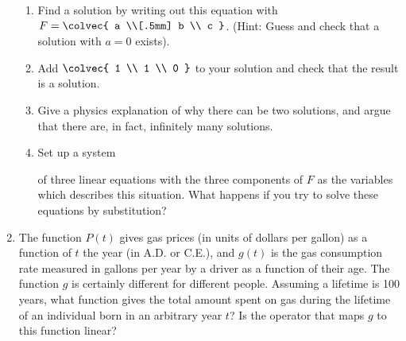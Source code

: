 \begin{enumerate}
\begin{enumerate}
\item Find a solution by writing out this equation with $F=\colvec{ a \\[.5mm] b \\ c }$. 
(Hint: Guess and check that a solution with $a=0$ exists).
\item Add $\colvec{ 1 \\ 1 \\ 0 }$ to your solution and check that the result is a solution.
\item Give a  physics explanation of why there can be two solutions, and argue that there are, in fact, infinitely many solutions. 
\item \hypertarget{crossmat}{Set up a system} of three linear equations with the three components of $F$ as the variables which describes this situation. What happens if you try to solve these equations by substitution?
\end{enumerate}


\item
The function $P(t)$ gives gas prices (in units of dollars per gallon) as a function of  $t$ the year (in A.D. or C.E.), and $g(t)$ is the gas consumption rate measured in gallons per year by a %
driver as a function of their age. 
The function $g$ is certainly different for different people. 
Assuming a lifetime is 100 years, what function gives the total amount spent on gas during the lifetime of an individual born in an arbitrary year $t$? Is the operator that maps $g$ to this function linear? \\


%
%
%
%
%


\end{enumerate}
